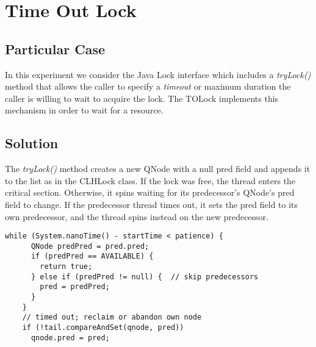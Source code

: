 


\section{\textbf{Time Out Lock}}



\subsection{Particular Case}
\par
In this experiment we consider the Java Lock interface which includes a \textit{tryLock()} method that allows the caller to specify a \textit{timeout} or maximum duration the caller is willing to wait to acquire the lock. The TOLock implements this mechanism in order to wait for a resource.
\par



\subsection{Solution}
\par
The \textit{tryLock()} method creates a new QNode with a null pred field and appends it to the list as in the CLHLock class. If the lock was free, the thread enters the critical section. Otherwise, it spins waiting for its predecessor’s QNode’s pred field to change. If the predecessor thread times out, it sets the pred field to its own predecessor, and the thread spins instead on the new predecessor. 
\par
\begin{lstlisting}[frame=single,breaklines=true]
    while (System.nanoTime() - startTime < patience) {
      QNode predPred = pred.pred;
      if (predPred == AVAILABLE) {
        return true;
      } else if (predPred != null) {  // skip predecessors
        pred = predPred;
      }
    }
    // timed out; reclaim or abandon own node
    if (!tail.compareAndSet(qnode, pred))
      qnode.pred = pred;
\end{lstlisting}



